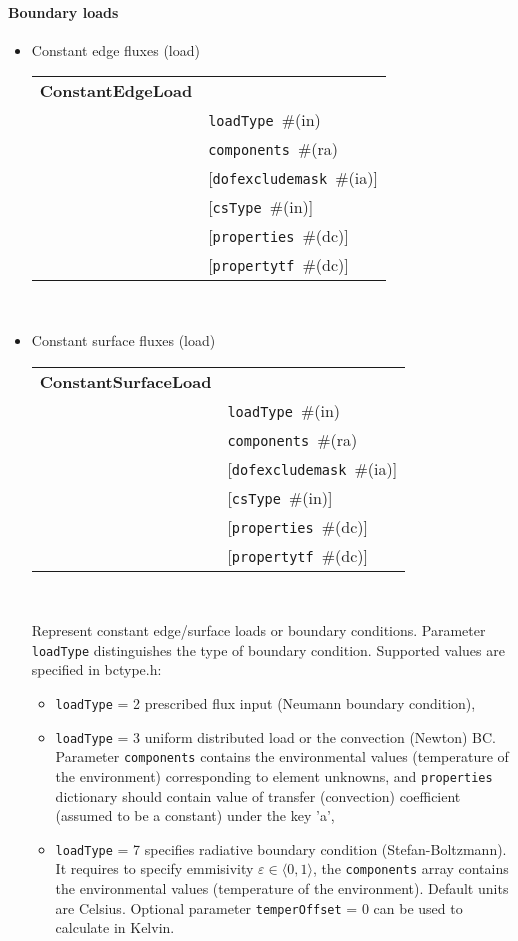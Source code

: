 \documentclass[a4paper]{report}
\newcommand{\param}[1]{\texttt{#1}} %
\newcommand{\optional}[1]{[#1]} %
\newcommand{\field}[2]{\param{#1}~\#{\tiny(#2)}} %
\newcommand{\optField}[2]{\optional{\field{#1}{#2}}}
\newcommand{\entKeywordInst}[1]{\textbf{#1}} %
\newenvironment{record}[1][]{\begin{tabular}{|ll}}{\end{tabular}\\}
\newcommand{\recentry}[2]{{#1}&{#2}\\}
\newcounter{rcc}
\newenvironment{record}[1][\textwidth]{\setcounter{rcc}{0}\rowcolors{1}{lightgray}{lightgray}\tabularx{#1}{llR} \hline}
               {\endtabularx}
\newcommand{\recentry}[2]{\ifthenelse{\value{rcc}>0}{$\backslash$ \\}{\setcounter{rcc}{1}}{#1}&{#2}&}
\begin{document}
\paragraph{Boundary loads}
\begin{itemize}
\item Constant edge fluxes (load)

\begin{record}[0.9\textwidth]
  \recentry{\entKeywordInst{ConstantEdgeLoad}}{}
  \recentry{}{\field{loadType}{in}}
  \recentry{}{\field{components}{ra}}
  \recentry{}{\optField{dofexcludemask}{ia}}
  \recentry{}{\optField{csType}{in}}
  \recentry{}{\optField{properties}{dc}}
  \recentry{}{\optField{propertytf}{dc}}
\end{record}
\item Constant surface fluxes (load)

\begin{record}[0.9\textwidth]
  \recentry{\entKeywordInst{ConstantSurfaceLoad}}{}
  \recentry{}{\field{loadType}{in}}
  \recentry{}{\field{components}{ra}}
  \recentry{}{\optField{dofexcludemask}{ia}}
  \recentry{}{\optField{csType}{in}}
  \recentry{}{\optField{properties}{dc}}
  \recentry{}{\optField{propertytf}{dc}}
\end{record}

Represent constant edge/surface loads or boundary conditions.
Parameter \param{loadType} distinguishes the type of boundary condition. Supported values are specified in bctype.h:
\begin{itemize}
\item \param{loadType} = 2 prescribed flux input (Neumann boundary condition),
\item \param{loadType} = 3 uniform distributed load or the convection (Newton) BC. Parameter \param{components} contains the
environmental values (temperature of the environment) corresponding to
element unknowns, and \param{properties} dictionary should contain
value of transfer (convection) coefficient (assumed to be a constant) under the key 'a',
\item \param{loadType} = 7 specifies radiative boundary condition (Stefan-Boltzmann). It requires to specify emmisivity $\varepsilon\in\langle 0,1\rangle$, the \param{components} array contains the environmental values (temperature of the environment). Default units are Celsius. Optional parameter \param{temperOffset} = 0 can be used to calculate in Kelvin.
\end{itemize}


\end{itemize}
\end{document}
